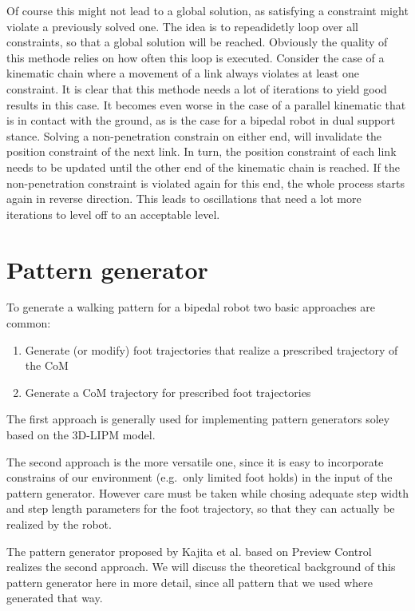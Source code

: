 \documentclass[english,ngerman]{KITreprt}
\newcommand{\clr}[2]{{\color{#1}{#2}}}
\newcommand{\todo}[1]{\marginpar{\clr{red}{#1}}}
\begin{document}
Of course this might not lead to a global solution, as satisfying a
constraint might violate a previously solved one. The idea is to
repeadidetly loop over all constraints, so that a global solution will
be reached. Obviously the quality of this methode relies on how often
this loop is executed. Consider the case of a kinematic chain where a
movement of a link always violates at least one constraint. It is clear
that this methode needs a lot of iterations to yield good results in
this case. It becomes even worse in the case of a parallel kinematic
that is in contact with the ground, as is the case for a bipedal robot
in dual support stance. Solving a non-penetration constrain on either
end, will invalidate the position constraint of the next link. In turn,
the position constraint of each link needs to be updated until the other
end of the kinematic chain is reached. If the non-penetration constraint
is violated again for this end, the whole process starts again in
reverse direction. This leads to oscillations that need a lot more
iterations to level off to an acceptable level.

\chapter{Pattern generator}\label{pattern-generator}

To generate a walking pattern for a bipedal robot two basic approaches
are common:

\begin{enumerate}
\def\labelenumi{\arabic{enumi}.}
\item
  Generate (or modify) foot trajectories that realize a prescribed
  trajectory of the CoM
\item
  Generate a CoM trajectory for prescribed foot trajectories
\end{enumerate}

The first approach is generally used for implementing pattern generators
soley based on the 3D-LIPM model. \todo{citation needed}

The second approach is the more versatile one, since it is easy to
incorporate constrains of our environment (e.g.~only limited foot holds)
in the input of the pattern generator. However care must be taken while
chosing adequate step width and step length parameters for the foot
trajectory, so that they can actually be realized by the robot.

The pattern generator proposed by Kajita et al. \todo{add citation}
based on Preview Control realizes the second approach. We will discuss
the theoretical background of this pattern generator here in more
detail, since all pattern that we used where generated that way.
\end{document}
